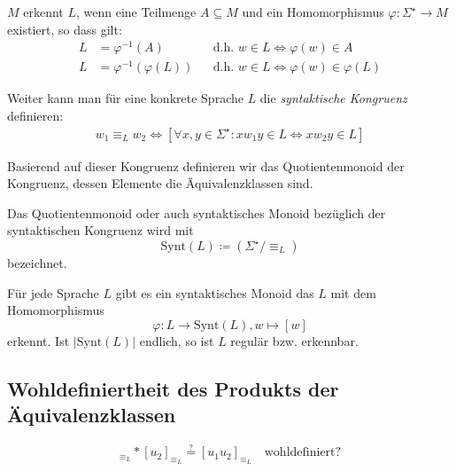 	$M$ erkennt $L$, wenn eine Teilmenge $A\subseteq M$ und ein Homomorphismus $\varphi:\Sigma^\star \rightarrow M$ existiert, so dass gilt:
	\begin{align*}
		L&=\varphi^{-1}(A) &&\text{d.h. }w\in L \Leftrightarrow \varphi(w)\in A\\
		L&=\varphi^{-1}(\varphi(L)) &&\text{d.h. }w\in L \Leftrightarrow \varphi(w)\in \varphi(L)
	\end{align*}

	Weiter kann man für eine konkrete Sprache $L$ die \emph{syntaktische Kongruenz} definieren:
	\begin{align*}
		w_1\equiv_Lw_2 \Longleftrightarrow [\forall x,y\in\Sigma^\star : xw_1y\in L \Leftrightarrow xw_2y\in L]
	\end{align*}

	Basierend auf dieser Kongruenz definieren wir das Quotientenmonoid der Kongruenz, dessen Elemente die Äquivalenzklassen sind.

	Das Quotientenmonoid oder auch syntaktisches Monoid bezüglich der syntaktischen Kongruenz wird mit
	\begin{equation*}
		\mathrm{Synt}(L)\coloneqq\left(\Sigma^\star/\equiv_L\right)
	\end{equation*}
	bezeichnet.

	Für jede Sprache $L$ gibt es ein syntaktisches Monoid das $L$ mit dem Homomorphismus
	\begin{equation*}
		\varphi: L\rightarrow \mathrm{Synt}(L), w\mapsto [w]
	\end{equation*}
	erkennt.
	Ist $|\mathrm{Synt}(L)|$ endlich, so ist $L$ regulär bzw. erkennbar.

	\subsection{Wohldefiniertheit des Produkts der Äquivalenzklassen}
	\begin{equation*}
		[u_1]_{\equiv_L}*[u_2]_{\equiv_L}\overset ? = [u_1u_2]_{\equiv_L} \quad\text{wohldefiniert?}
	\end{equation*}

